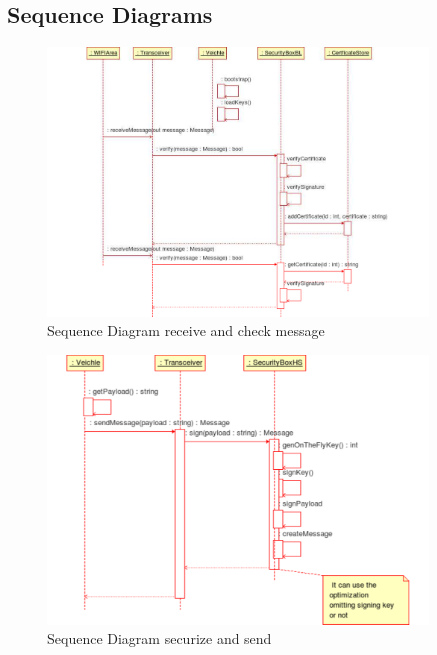 \subsection{Sequence Diagrams}
\begin{figure}[ht]
\centerline{\includegraphics[width=0.9\textwidth]{baseline_receive_message.pdf}}
\caption{Sequence Diagram \baseline receive and check message}
\label{fig:sequence_receive_baseline}
\end{figure}
\begin{figure}[ht]
\centerline{\includegraphics[width=0.9\textwidth]{hybrid_scheme_send_message.pdf}}
\caption{Sequence Diagram \hybrid securize and send}
\label{fig:sequence_send_hybridscheme}
\end{figure}
